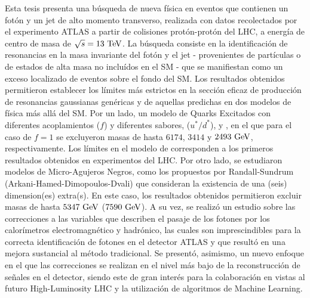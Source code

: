 Esta tesis presenta una búsqueda de nueva física en eventos que contienen un fotón y un jet de alto momento transverso, realizada con datos recolectados por el experimento \acs{ATLAS} a partir de colisiones protón-protón del \ac{LHC}, a energía de centro de masa de \(\sqrt{s}=13~\text{TeV}\).
La búsqueda consiste en la identificación de resonancias en la masa invariante del fotón y el jet - provenientes de partículas o de estados de alta masa no incluídos en el \ac{SM} - que se manifiestan como un exceso localizado de eventos sobre el fondo del \ac{SM}.
Los resultados obtenidos permitieron establecer los límites más estrictos en la sección eficaz de producción de resonancias gaussianas genéricas y de aquellas predichas en dos modelos de física más allá del \ac{SM}.
Por un lado, un modelo de Quarks Excitados con diferentes acoplamientos (\(f\)) y diferentes sabores, \qstar (\(u^*/d^*\)), \cstar y \bstar, en el que para el caso de \(f=1\) se excluyeron masas de hasta \(6174\), \(3414\) y \(2493~\text{GeV}\), respectivamente.
Los límites en el modelo de \cstar corresponden a los primeros resultados obtenidos en experimentos del \acs{LHC}.
Por otro lado, se estudiaron modelos de Micro-Agujeros Negros, como los propuestos por Randall-Sundrum (Arkani-Hamed-Dimopoulos-Dvali) que consideran la existencia de una (seis) dimension(es) extra(s). En este caso, los resultados obtenidos permitieron excluir masas de hasta \(5347~\text{GeV}\) (\(7590~\text{GeV}\)).
A su vez, se realizó un estudio sobre las correcciones a las variables que describen el pasaje de los fotones por los calorímetros electromagnético y hadrónico, las cuales son imprescindibles para la correcta identificación de fotones en el detector \acs{ATLAS} y que resultó en una mejora sustancial al método tradicional. Se presentó, asimismo, un nuevo enfoque en el que las correcciones se realizan en el nivel más bajo de la reconstrucción de señales en el detector, siendo este de gran interés para la colaboración en vistas al futuro High-Luminosity \ac{LHC} y la utilización de algoritmos de Machine Learning.


\noindent 
